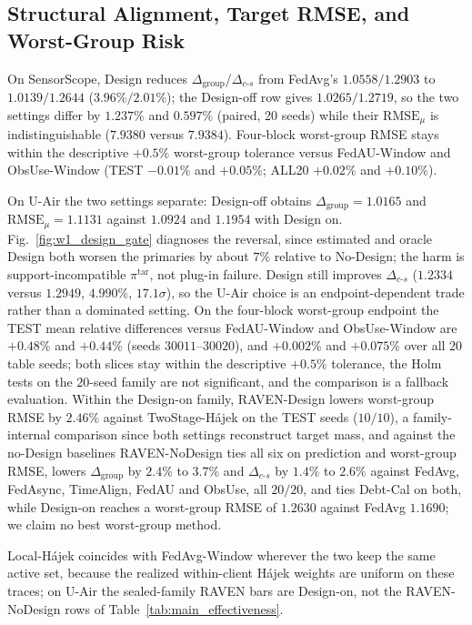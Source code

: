 \documentclass[letterpaper,journal]{IEEEtran}
\begin{document}
\subsection{Structural Alignment, Target RMSE, and Worst-Group Risk}
\label{subsec:eval_rq2}

On SensorScope, Design reduces
$\Delta_{\mathrm{group}}$/$\Delta_{c\text{-}s}$ from FedAvg's $1.0558/1.2903$ to
$1.0139/1.2644$ ($3.96\%/2.01\%$); the Design-off row gives $1.0265/1.2719$, so
the two settings differ by $1.237\%$ and $0.597\%$ (paired, 20 seeds) while
their $\mathrm{RMSE}_{\mu}$ is indistinguishable ($7.9380$ versus $7.9384$).
Four-block worst-group RMSE stays within the descriptive $+0.5\%$ worst-group
tolerance versus FedAU-Window and
ObsUse-Window (TEST $-0.01\%$ and $+0.05\%$; ALL20 $+0.02\%$ and $+0.10\%$).

On U-Air the two settings separate: Design-off obtains
$\Delta_{\mathrm{group}}=1.0165$ and $\mathrm{RMSE}_{\mu}=1.1131$ against
$1.0924$ and $1.1954$ with Design on.  Fig.~\ref{fig:w1_design_gate} diagnoses
the reversal, since estimated and oracle Design both worsen the primaries by
about $7\%$ relative to No-Design; the harm is support-incompatible
$\pi^{\mathrm{tar}}$, not plug-in failure.  Design still improves
$\Delta_{c\text{-}s}$ ($1.2334$ versus $1.2949$, $4.990\%$, $17.1\sigma$), so the
U-Air choice is an endpoint-dependent trade rather than a dominated setting.  On
the four-block worst-group endpoint the TEST mean relative differences versus
FedAU-Window and ObsUse-Window are $+0.48\%$ and $+0.44\%$ (seeds
$30011$--$30020$), and $+0.002\%$ and $+0.075\%$ over all $20$ table seeds; both
slices stay within the descriptive $+0.5\%$ tolerance, the Holm tests on the
$20$-seed family are not significant, and the comparison is a fallback
evaluation.  Within the Design-on family,
RAVEN-Design lowers worst-group RMSE by $2.46\%$ against TwoStage-H\'ajek on the
TEST seeds ($10/10$), a family-internal comparison since both settings
reconstruct target mass, and against the no-Design baselines RAVEN-NoDesign ties
all six on prediction and worst-group RMSE, lowers $\Delta_{\mathrm{group}}$ by
$2.4\%$ to $3.7\%$ and $\Delta_{c\text{-}s}$ by $1.4\%$ to $2.6\%$ against
FedAvg, FedAsync, TimeAlign, FedAU and ObsUse, all $20/20$, and ties Debt-Cal on
both, while Design-on reaches a worst-group RMSE of $1.2630$ against FedAvg
$1.1690$; we claim no best worst-group method.

Local-H\'ajek coincides with FedAvg-Window wherever the two keep the same active
set, because the realized within-client H\'ajek weights are uniform on these
traces; on U-Air the sealed-family RAVEN bars are Design-on, not the
RAVEN-NoDesign rows of Table~\ref{tab:main_effectiveness}.
\end{document}
